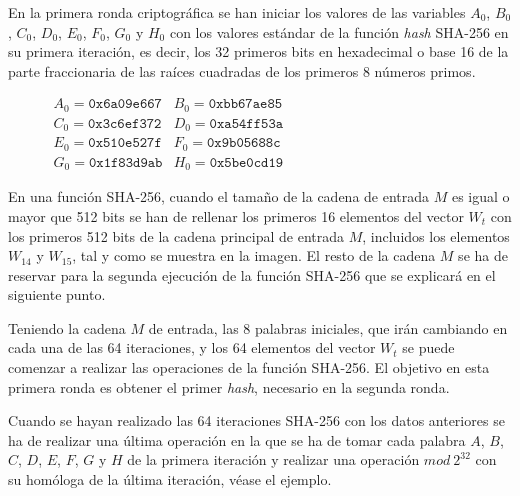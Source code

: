 \documentclass{article}
\begin{document}
    \begin{minipage}{0.6\textwidth}
    En la primera ronda criptográfica se han iniciar los valores de las variables $A_{0}$, $B_{0}$, $C_{0}$, $D_{0}$, $E_{0}$, $F_{0}$, $G_{0}$ y $H_{0}$ con los valores estándar de la función \textit{hash} SHA-256 en su primera iteración, es decir, los 32 primeros bits en hexadecimal o base 16 de la parte fraccionaria de las raíces cuadradas de los primeros 8 números primos.
    
    \begin{figure}[H]
    \centering
        $\begin{array}{rr}
            A_{0} = \texttt{0x6a09e667} & B_{0} = \texttt{0xbb67ae85} \\
            C_{0} = \texttt{0x3c6ef372} & D_{0} = \texttt{0xa54ff53a} \\
            E_{0} = \texttt{0x510e527f} & F_{0} = \texttt{0x9b05688c} \\
            G_{0} = \texttt{0x1f83d9ab} & H_{0} = \texttt{0x5be0cd19}
        \end{array}$
    \end{figure}
    
    En una función SHA-256, cuando el tamaño de la cadena de entrada $M$ es igual o mayor que 512 bits se han de rellenar los primeros 16 elementos del vector $W_t$ con los primeros 512 bits de la cadena principal de entrada $M$, incluidos los elementos $W_{14}$ y $W_{15}$, tal y como se muestra en la imagen. El resto de la cadena $M$ se ha de reservar para la segunda ejecución de la función SHA-256 que se explicará en el siguiente punto.
    \end{minipage}
    
    \vspace{1mm}
    
    Teniendo la cadena $M$ de entrada, las 8 palabras iniciales, que irán cambiando en cada una de las 64 iteraciones, y los 64 elementos del vector $W_t$ se puede comenzar a realizar las operaciones de la función SHA-256. El objetivo en esta primera ronda es obtener el primer \textit{hash}, necesario en la segunda ronda.
    
    \vspace{3mm}
    
    Cuando se hayan realizado las 64 iteraciones SHA-256 con los datos anteriores se ha de realizar una última operación en la que se ha de tomar cada palabra $A$, $B$, $C$, $D$, $E$, $F$, $G$ y $H$ de la primera iteración y realizar  una operación $mod\ 2^{32}$ con su homóloga de la última iteración, véase el ejemplo.
    
\end{document}
